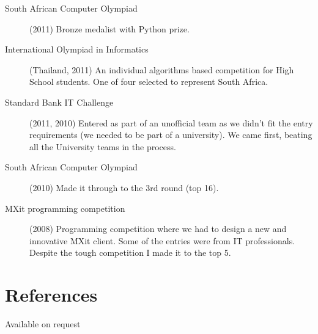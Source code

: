 \documentclass[margin,line,a4paper]{resume}
\begin{document}
\begin{resume}
\begin{description}
                \item [South African Computer Olympiad] (2011) Bronze medalist with Python prize.

                \item [International Olympiad in Informatics] (Thailand, 2011) An individual 
                algorithms based competition for High School students. One of four selected
                to represent South Africa.

                \item [Standard Bank IT Challenge] (2011, 2010) Entered as part of an unofficial team
                as we didn't fit the entry requirements (we needed to be part of a university).
                We came first, beating all the University teams in the process.

                \item [South African Computer Olympiad] (2010) Made it through to the 3rd
                round (top 16).

                \item [MXit programming competition] (2008) Programming competition where we
                had to design a new and innovative MXit client.  Some of the
                entries were from IT professionals. Despite the tough competition I made it to the top 5.
            \end{description}

        \section{\mysidestyle References}
            Available on request
    \end{resume}
\end{document}
